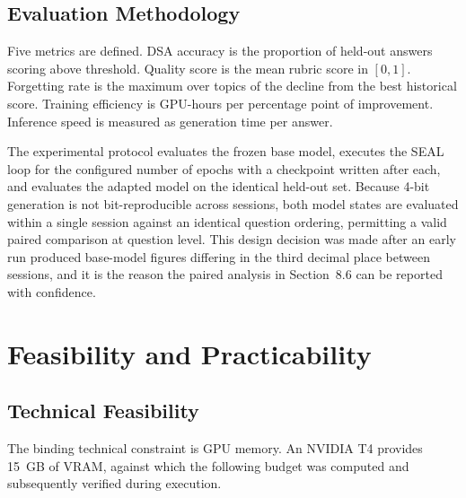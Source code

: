 \documentclass[12pt,a4paper]{report}
\begin{document}
\section{Evaluation Methodology}

Five metrics are defined. DSA accuracy is the proportion of held-out answers scoring above threshold. Quality score is the mean rubric score in $[0, 1]$. Forgetting rate is the maximum over topics of the decline from the best historical score. Training efficiency is GPU-hours per percentage point of improvement. Inference speed is measured as generation time per answer.

The experimental protocol evaluates the frozen base model, executes the SEAL loop for the configured number of epochs with a checkpoint written after each, and evaluates the adapted model on the identical held-out set. Because 4-bit generation is not bit-reproducible across sessions, both model states are evaluated within a single session against an identical question ordering, permitting a valid paired comparison at question level. This design decision was made after an early run produced base-model figures differing in the third decimal place between sessions, and it is the reason the paired analysis in Section~8.6 can be reported with confidence.

\chapter{Feasibility and Practicability}

\section{Technical Feasibility}

The binding technical constraint is GPU memory. An NVIDIA T4 provides 15~GB of VRAM, against which the following budget was computed and subsequently verified during execution.
\end{document}
